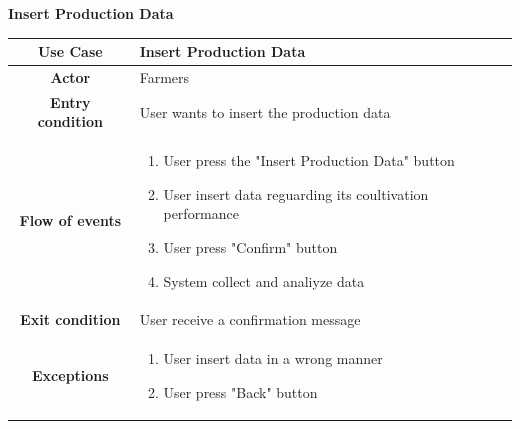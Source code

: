 \documentclass[table, 12pt]{article}
\begin{document}
\begin{itemize}
            \begin{table}[H]
                \item[] \textbf{Insert Production Data}
                \item[] 
                \centering
                \begin{tabular}{|c |m{}|}
                    \hline
                    \textbf{Use Case} & Insert Production Data\\ \hline
                    \textbf{Actor} & Farmers\\ \hline
                    \textbf{Entry condition} & User wants to insert the production data\\  \hline
                    \textbf{Flow of events} & \begin{enumerate}
                                                \item User press the "Insert Production Data" button
                                                \item User insert data reguarding its coultivation performance
                                                \item User press "Confirm" button
                                                \item System collect and analiyze data
                                            \end{enumerate}\\ \hline
                    \textbf{Exit condition} & User receive a confirmation message\\ \hline
                    \textbf{Exceptions} &  \begin{enumerate}
                        \item User insert data in a wrong manner
                        \item User press "Back" button
                    \end{enumerate}\\ \hline                    
                \end{tabular}
            \end{table}
            

\end{itemize}
\end{document}
